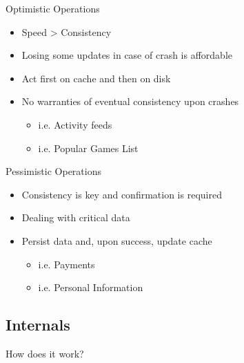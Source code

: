 \documentclass[aspectratio=169]{beamer}
\begin{document}
\begin{frame}{Optimistic Operations}
    \begin{itemize}
        \item Speed > Consistency
        \item Losing some updates in case of crash is affordable
        \item Act first on cache and then on disk
        \item No warranties of eventual consistency upon crashes
            \begin{itemize}
                \item i.e. Activity feeds
                \item i.e. Popular Games List
            \end{itemize}
    \end{itemize}
\end{frame}

\begin{frame}{Pessimistic Operations}
    \begin{itemize}
        \item Consistency is key and confirmation is required
        \item Dealing with critical data
        \item Persist data and, upon success, update cache
            \begin{itemize}
                \item i.e. Payments
                \item i.e. Personal Information
            \end{itemize}
    \end{itemize}
\end{frame}

\subsection{Internals}
{
\begin{frame}{How does it work?}
\end{frame}
}
\end{document}
